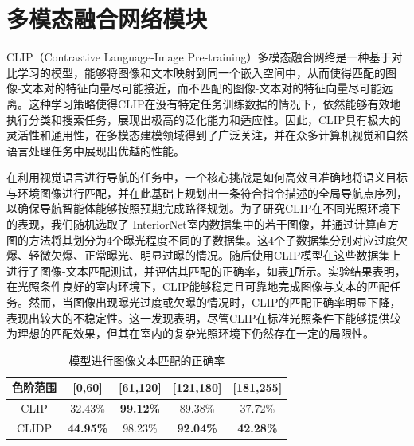 \section{多模态融合网络模块}
CLIP（Contrastive Language-Image Pre-training）多模态融合网络\cite{radford2021learning}是一种基于对比学习的模型，能够将图像和文本映射到同一个嵌入空间中，从而使得匹配的图像-文本对的特征向量尽可能接近，而不匹配的图像-文本对的特征向量尽可能远离。这种学习策略使得CLIP在没有特定任务训练数据的情况下，依然能够有效地执行分类和搜索任务，展现出极高的泛化能力和适应性。因此，CLIP具有极大的灵活性和通用性，在多模态建模领域得到了广泛关注，并在众多计算机视觉和自然语言处理任务中展现出优越的性能。

在利用视觉语言进行导航的任务中，一个核心挑战是如何高效且准确地将语义目标与环境图像进行匹配，并在此基础上规划出一条符合指令描述的全局导航点序列，以确保导航智能体能够按照预期完成路径规划。为了研究CLIP在不同光照环境下的表现，我们随机选取了 InteriorNet室内数据集\cite{li2018interiornet}中的若干图像，并通过计算直方图的方法将其划分为4个曝光程度不同的子数据集。这4个子数据集分别对应过度欠爆、轻微欠爆、正常曝光、明显过曝的情况。随后使用CLIP模型在这些数据集上进行了图像-文本匹配测试，并评估其匹配的正确率，如表\ref{Matching_accuracy}所示。实验结果表明，在光照条件良好的室内环境下，CLIP能够稳定且可靠地完成图像与文本的匹配任务。然而，当图像出现曝光过度或欠曝的情况时，CLIP的匹配正确率明显下降，表现出较大的不稳定性。这一发现表明，尽管CLIP在标准光照条件下能够提供较为理想的匹配效果，但其在室内的复杂光照环境下仍然存在一定的局限性。

\begin{table}[ht]
	\centering
	\caption{模型进行图像文本匹配的正确率} %
	\begin{tabular}{ccccc} %
	\toprule %
	色阶范围 & [0,60] & [61,120] & [121,180] & [181,255]  \\ %
	\midrule %
	CLIP & 32.43\% & \textbf{99.12\%} & 89.38\% & 37.72\% \\ %
	CLIDP & \textbf{44.95\%} & 98.23\% & \textbf{92.04\%} & \textbf{42.28\%} \\ %
	\bottomrule %
	\end{tabular}
	\label{Matching_accuracy}
\end{table}

